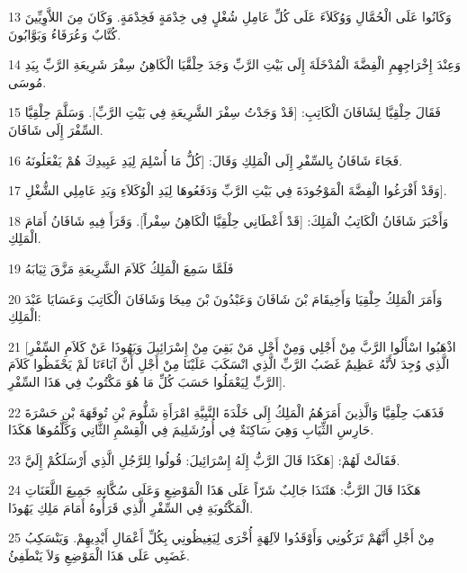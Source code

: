 \par 13 وَكَانُوا عَلَى الْحُمَّالِ وَوُكَلاَءَ عَلَى كُلِّ عَامِلِ شُغْلٍ فِي خِدْمَةٍ فَخِدْمَةٍ. وَكَانَ مِنَ اللاَّوِيِّينَ كُتَّابٌ وَعُرَفَاءُ وَبَوَّابُونَ.
\par 14 وَعِنْدَ إِخْرَاجِهِمِ الْفِضَّةَ الْمُدْخَلَةَ إِلَى بَيْتِ الرَّبِّ وَجَدَ حِلْقَّيَا الْكَاهِنُ سِفْرَ شَرِيعَةِ الرَّبِّ بِيَدِ مُوسَى.
\par 15 فَقَالَ حِلْقِيَّا لِشَافَانَ الْكَاتِبِ: [قَدْ وَجَدْتُ سِفْرَ الشَّرِيعَةِ فِي بَيْتِ الرَّبِّ]. وَسَلَّمَ حِلْقِيَّا السِّفْرَ إِلَى شَافَانَ.
\par 16 فَجَاءَ شَافَانُ بِالسِّفْرِ إِلَى الْمَلِكِ وَقَالَ: [كُلُّ مَا أُسْلِمَ لِيَدِ عَبِيدِكَ هُمْ يَفْعَلُونَهُ.
\par 17 وَقَدْ أَفْرَغُوا الْفِضَّةَ الْمَوْجُودَةَ فِي بَيْتِ الرَّبِّ وَدَفَعُوهَا لِيَدِ الْوُكَلاَءِ وَيَدِ عَامِلِي الشُّغْلِ].
\par 18 وَأَخْبَرَ شَافَانُ الْكَاتِبُ الْمَلِكَ: [قَدْ أَعْطَانِي حِلْقِيَّا الْكَاهِنُ سِفْراً]. وَقَرَأَ فِيهِ شَافَانُ أَمَامَ الْمَلِكِ.
\par 19 فَلَمَّا سَمِعَ الْمَلِكُ كَلاَمَ الشَّرِيعَةِ مَزَّقَ ثِيَابَهُ
\par 20 وَأَمَرَ الْمَلِكُ حِلْقِيَا وَأَخِيقَامَ بْنَ شَافَانَ وَعَبْدُونَ بْنَ مِيخَا وَشَافَانَ الْكَاتِبَ وَعَسَايَا عَبْدَ الْمَلِكِ:
\par 21 [اذْهَبُوا اسْأَلُوا الرَّبَّ مِنْ أَجْلِي وَمِنْ أَجْلِ مَنْ بَقِيَ مِنْ إِسْرَائِيلَ وَيَهُوذَا عَنْ كَلاَمِ السِّفْرِ الَّذِي وُجِدَ لأَنَّهُ عَظِيمٌ غَضَبُ الرَّبِّ الَّذِي انْسَكَبَ عَلَيْنَا مِنْ أَجْلِ أَنَّ آبَاءَنَا لَمْ يَحْفَظُوا كَلاَمَ الرَّبِّ لِيَعْمَلُوا حَسَبَ كُلِّ مَا هُوَ مَكْتُوبٌ فِي هَذَا السِّفْرِ].
\par 22 فَذَهَبَ حِلْقِيَّا وَالَّذِينَ أَمَرَهُمُ الْمَلِكُ إِلَى خَلْدَةَ النَّبِيَّةِ امْرَأَةِ شَلُّومَ بْنِ تُوقَهَةَ بْنِ حَسْرَةَ حَارِسِ الثِّيَابِ وَهِيَ سَاكِنَةٌ فِي أُورُشَلِيمَ فِي الْقِسْمِ الثَّانِي وَكَلَّمُوهَا هَكَذَا.
\par 23 فَقَالَتْ لَهُمْ: [هَكَذَا قَالَ الرَّبُّ إِلَهُ إِسْرَائِيلَ: قُولُوا لِلرَّجُلِ الَّذِي أَرْسَلَكُمْ إِلَيَّ.
\par 24 هَكَذَا قَالَ الرَّبُّ: هَئَنَذَا جَالِبٌ شَرّاً عَلَى هَذَا الْمَوْضِعِ وَعَلَى سُكَّانِهِ جَمِيعَ اللَّعَنَاتِ الْمَكْتُوبَةِ فِي السِّفْرِ الَّذِي قَرَأُوهُ أَمَامَ مَلِكِ يَهُوذَا.
\par 25 مِنْ أَجْلِ أَنَّهُمْ تَرَكُونِي وَأَوْقَدُوا لآلِهَةٍ أُخْرَى لِيَغِيظُونِي بِكُلِّ أَعْمَالِ أَيْدِيهِمْ. وَيَنْسَكِبُ غَضَبِي عَلَى هَذَا الْمَوْضِعِ وَلاَ يَنْطَفِئُ.
